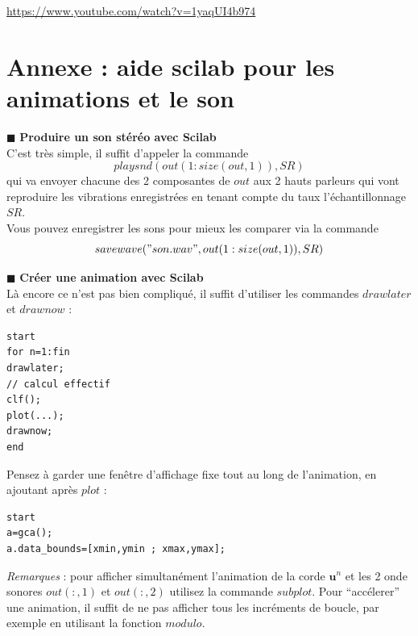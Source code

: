\documentclass[a4,12pt]{article}
\newcommand{\ub}{\mathbf{u}}
\begin{document}
\begin{center}
	\url{https://www.youtube.com/watch?v=1yaqUI4b974}
\end{center}

\newpage

\section*{Annexe : aide scilab pour les animations et le son}

\hspace{0.5cm} $\blacksquare$ \textbf{Produire un son stéréo avec Scilab}\\

C'est très simple, il suffit d'appeler la commande 
\[
playsnd(out(1:size(out,1)),SR)
\]
qui va envoyer chacune des 2 composantes de $out$ aux 2 hauts parleurs qui vont reproduire les vibrations enregistrées en tenant compte du taux l'échantillonnage $SR$.\\

Vous pouvez enregistrer les sons pour mieux les comparer via la commande 
\[
savewave("son.wav",out(1:size(out,1)),SR)
\]

\hspace{0.5cm} $\blacksquare$ \textbf{Créer une animation avec Scilab}\\

Là encore ce n'est pas bien compliqué, il suffit d'utiliser les commandes $drawlater$ et $drawnow$ :

\begin{lstlisting}[frame=single,caption=Création d'une animation dans une boucle]  
start
for n=1:fin
drawlater;
// calcul effectif
clf();
plot(...);
drawnow;
end
\end{lstlisting}

Pensez à garder une fenêtre d'affichage fixe tout au long de l'animation, en ajoutant après $plot$ : 

\begin{lstlisting}[frame=single,caption=Fixer les dimensions du repère courant]  
start
a=gca();
a.data_bounds=[xmin,ymin ; xmax,ymax];
\end{lstlisting}

\textit{Remarques} : pour afficher simultanément l'animation de la corde $\ub^n$ et les 2 onde sonores $out(:,1)$ et $out(:,2)$ utilisez la commande $subplot$. Pour \enquote{accélerer} une animation, il suffit de ne pas afficher tous les incréments de boucle, par exemple en utilisant la fonction $modulo$.\\
\end{document}
